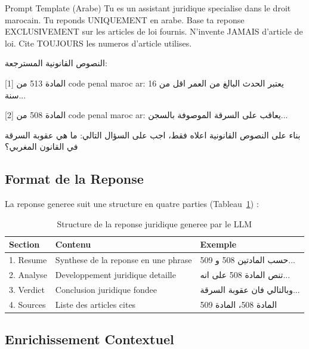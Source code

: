 \begin{jsonblock}{Prompt Template (Arabe)}
Tu es un assistant juridique specialise dans le droit marocain.
Tu reponds UNIQUEMENT en arabe.
Base ta reponse EXCLUSIVEMENT sur les articles de loi fournis.
N'invente JAMAIS d'article de loi.
Cite TOUJOURS les numeros d'article utilises.

\textarabic{النصوص القانونية المسترجعة:}

[1] \textarabic{المادة 513 من code penal maroc ar:}
\textarabic{يعتبر الحدث البالغ من العمر اقل من 16 سنة...}

[2] \textarabic{المادة 508 من code penal maroc ar:}
\textarabic{يعاقب على السرقة الموصوفة بالسجن...}

\textarabic{بناء على النصوص القانونية اعلاه فقط، اجب على السؤال التالي:}
\textarabic{ما هي عقوبة السرقة في القانون المغربي؟}
\end{jsonblock}
\label{lst:prompt-template}

\subsection{Format de la Reponse}

La reponse generee suit une structure en quatre parties (Tableau~\ref{tab:response-format}) :

\begin{table}[h]
\centering
\renewcommand{\arraystretch}{1.3}
\begin{tabular}{|l|p{6cm}|l|}
\hline
\rowcolor{LightBlue}
\textbf{\color{PrimaryBlue}Section} & \textbf{\color{PrimaryBlue}Contenu} & \textbf{\color{PrimaryBlue}Exemple} \\
\hline
1. Resume & Synthese de la reponse en une phrase & \textarabic{حسب المادتين 508 و 509...} \\
2. Analyse & Developpement juridique detaille & \textarabic{تنص المادة 508 على انه...} \\
3. Verdict & Conclusion juridique fondee & \textarabic{وبالتالي فان عقوبة السرقة...} \\
4. Sources & Liste des articles cites & \textarabic{المادة 508، المادة 509} \\
\hline
\end{tabular}
\caption{Structure de la reponse juridique generee par le LLM}
\label{tab:response-format}
\end{table}

\subsection{Enrichissement Contextuel}

